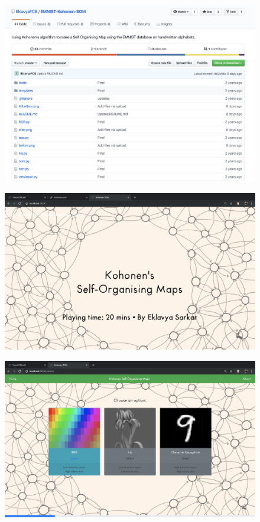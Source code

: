 \documentclass[fleqn, journal, onecolumn]{IEEEtran}             %
\theoremstyle{break}                                            %
\begin{document}
      \begin{figure}[h!]
        \centering
        \includegraphics[width=\textwidth]{Tesis3}
      \end{figure}

      \begin{figure}[h!]
        \centering
        \includegraphics[width=\textwidth]{Tesis4}
      \end{figure}

      \begin{figure}[h!]
        \centering
        \includegraphics[width=\textwidth]{Tesis5}
      \end{figure}
\end{document}
